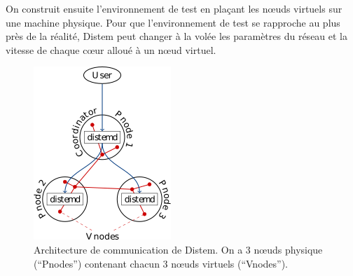 On construit ensuite l'environnement de test en plaçant les n\oe uds virtuels
sur une machine physique. Pour que l'environnement de test se rapproche au plus
près de la réalité, Distem peut changer à la volée les paramètres du réseau et
la vitesse de chaque c\oe ur alloué à un n\oe ud virtuel.

\begin{figure}
  \centering
  \includegraphics{Pictures/png/Distem_architecture}
  \caption{Architecture de communication de Distem. On a 3 n\oe uds physique (``Pnodes'') contenant chacun 3 n\oe uds virtuels (``Vnodes'').}
  \label{Distem_archi}
\end{figure}

